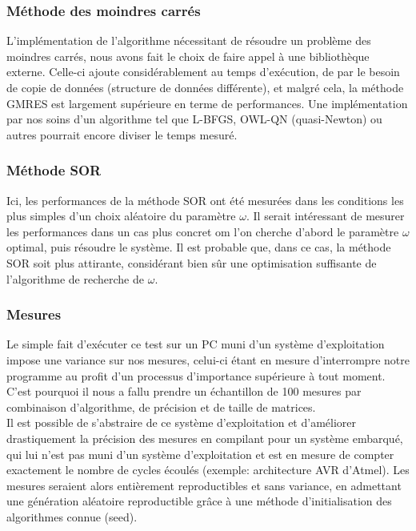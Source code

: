 \subsubsection{Méthode des moindres carrés}
L'implémentation de l'algorithme nécessitant de résoudre un problème des moindres carrés, nous avons fait le choix de faire appel à une bibliothèque externe. Celle-ci ajoute considérablement au temps d'exécution, de par le besoin de copie de données (structure de données différente), et malgré cela, la méthode GMRES est largement supérieure en terme de performances. Une implémentation par nos soins d'un algorithme tel que L-BFGS, OWL-QN (quasi-Newton) ou autres pourrait encore diviser le temps mesuré.


\subsubsection{Méthode SOR}
Ici, les performances de la méthode SOR ont été mesurées dans les conditions les plus simples d'un choix aléatoire du paramètre $\omega$. Il serait intéressant de mesurer les performances dans un cas plus concret om l'on cherche d'abord le paramètre $\omega$ optimal, puis résoudre le système. Il est probable que, dans ce cas, la méthode SOR soit plus attirante, considérant bien sûr une optimisation suffisante de l'algorithme de recherche de $\omega$.

\subsubsection{Mesures}
Le simple fait d'exécuter ce test sur un PC muni d'un système d'exploitation impose une variance sur nos mesures, celui-ci étant en mesure d'interrompre notre programme au profit d'un processus d'importance supérieure à tout moment. C'est pourquoi il nous a fallu prendre un échantillon de 100 mesures par combinaison d'algorithme, de précision et de taille de matrices.\\

Il est possible de s'abstraire de ce système d'exploitation et d'améliorer drastiquement la précision des mesures en compilant pour un système embarqué, qui lui n'est pas muni d'un système d'exploitation et est en mesure de compter exactement le nombre de cycles écoulés (exemple: architecture AVR d'Atmel). Les mesures seraient alors entièrement reproductibles et sans variance, en admettant une génération aléatoire reproductible grâce à une méthode d'initialisation des algorithmes connue (seed). 


